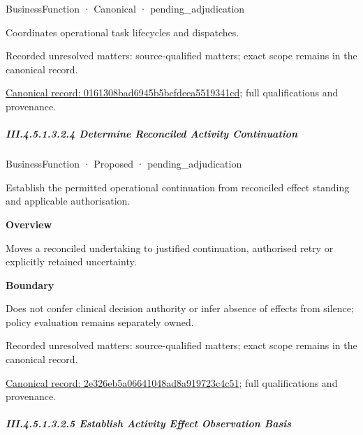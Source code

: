 \label{element:0161308bad6945b5bcfdeea5519341cd}
{\small BusinessFunction · Canonical · pending\_adjudication}\par

Coordinates operational task lifecycles and dispatches.


{\small Recorded unresolved matters: source-qualified matters; exact scope remains in the canonical record.}\par
{\footnotesize \href{../../../../continuum/business/business-function/0161308bad6945b5bcfdeea5519341cd.md}{Canonical record: 0161308bad6945b5bcfdeea5519341cd}; full qualifications and provenance.}\par
\subparagraph*{III.4.5.1.3.2.4 Determine Reconciled Activity Continuation}
\label{navigation:III.4.5.1.3.2.4}

\label{element:2e326eb5a06641048ad8a919723c4c51}
{\small BusinessFunction · Proposed · pending\_adjudication}\par

Establish the permitted operational continuation from reconciled effect standing and applicable authorisation.



\textbf{Overview}



Moves a reconciled undertaking to justified continuation, authorised retry or explicitly retained uncertainty.



\textbf{Boundary}



Does not confer clinical decision authority or infer absence of effects from silence; policy evaluation remains separately owned.


{\small Recorded unresolved matters: source-qualified matters; exact scope remains in the canonical record.}\par
{\footnotesize \href{../../../../continuum/business/business-function/2e326eb5a06641048ad8a919723c4c51.md}{Canonical record: 2e326eb5a06641048ad8a919723c4c51}; full qualifications and provenance.}\par
\subparagraph*{III.4.5.1.3.2.5 Establish Activity Effect Observation Basis}
\label{navigation:III.4.5.1.3.2.5}

